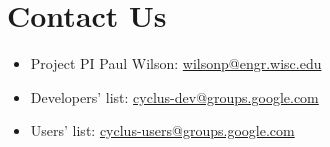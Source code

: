 \documentclass[letterpaper,10pt,english]{sphinxmanual}
\begin{document}
\chapter{Contact Us}
\label{index:contact-us}\begin{itemize}
\item {} 
Project PI Paul Wilson: \href{mailto:wilsonp@engr.wisc.edu}{wilsonp@engr.wisc.edu}

\item {} 
Developers' list: \href{mailto:cyclus-dev@groups.google.com}{cyclus-dev@groups.google.com}

\item {} 
Users' list: \href{mailto:cyclus-users@groups.google.com}{cyclus-users@groups.google.com}

\end{itemize}
\end{document}
